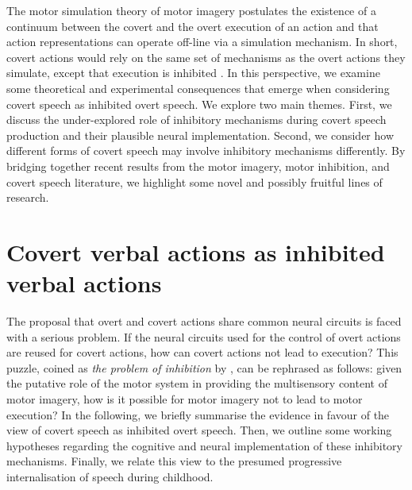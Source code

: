 \documentclass[utf8]{template/frontiersSCNS} %
\begin{document}

The motor simulation theory \citep{jeannerod_origin_2006, jeannerod_representing_1994, jeannerod_neural_2001} of motor imagery postulates the existence of a continuum between the covert and the overt execution of an action and that action representations can operate off-line via a simulation mechanism. In short, covert actions would rely on the same set of mechanisms as the overt actions they simulate, except that execution is inhibited \citep{oshea_does_2017}. In this perspective, we examine some theoretical and experimental consequences that emerge when considering covert speech as inhibited overt speech. We explore two main themes. First, we discuss the under-explored role of inhibitory mechanisms during covert speech production and their plausible neural implementation. Second, we consider how different forms of covert speech may involve inhibitory mechanisms differently. By bridging together recent results from the motor imagery, motor inhibition, and covert speech literature, we highlight some novel and possibly fruitful lines of research.

\section{Covert verbal actions as inhibited verbal actions}

The proposal that overt and covert actions share common neural circuits is faced with a serious problem. If the neural circuits used for the control of overt actions are reused for covert actions, how can covert actions not lead to execution? This puzzle, coined as \textit{the problem of inhibition} by \cite{jeannerod_neural_2001}, can be rephrased as follows: given the putative role of the motor system in providing the multisensory content of motor imagery, how is it possible for motor imagery not to lead to motor execution? In the following, we briefly summarise the evidence in favour of the view of covert speech as inhibited overt speech. Then, we outline some working hypotheses regarding the cognitive and neural implementation of these inhibitory mechanisms. Finally, we relate this view to the presumed progressive internalisation of speech during childhood.
\end{document}
